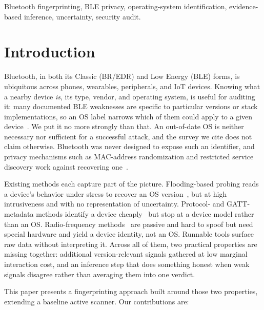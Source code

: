 \documentclass[conference]{IEEEtran}
\begin{document}
\begin{IEEEkeywords}
Bluetooth fingerprinting, BLE privacy, operating-system identification,
evidence-based inference, uncertainty, security audit.
\end{IEEEkeywords}

\section{Introduction}
Bluetooth, in both its Classic (BR/EDR) and Low Energy (BLE) forms, is
ubiquitous across phones, wearables, peripherals, and IoT devices.
Knowing what a nearby device \emph{is}, its type, vendor, and operating
system, is useful for auditing it: many documented BLE weaknesses are
specific to particular versions or stack implementations, so an OS label
narrows which of them could apply to a given
device~\cite{barua2022blethreats}. We put it no more strongly than that.
An out-of-date OS is neither necessary nor sufficient for a successful
attack, and the survey we cite does not claim otherwise. Bluetooth was
never designed to expose such an identifier, and privacy mechanisms such
as MAC-address randomization and restricted service discovery work
against recovering one~\cite{martin2017macrandom}.

Existing methods each capture part of the picture. Flooding-based
probing reads a device's behavior under stress to recover an OS
version~\cite{kavisankar2024osid}, but at high intrusiveness and with no
representation of uncertainty. Protocol- and GATT-metadata methods
identify a device cheaply~\cite{celosia2019gatt} but stop at a device
model rather than an OS. Radio-frequency
methods~\cite{santanacruz2024jsdivergence} are passive and hard to spoof
but need special hardware and yield a device identity, not an OS.
Runnable tools surface raw data without interpreting it. Across all of them,
two practical properties are missing together: additional
version-relevant signals gathered at low marginal interaction cost, and
an inference step that does something honest when weak signals disagree
rather than averaging them into one verdict.

This paper presents a fingerprinting approach built around those two
properties, extending a baseline active scanner. Our contributions are:
\end{document}
